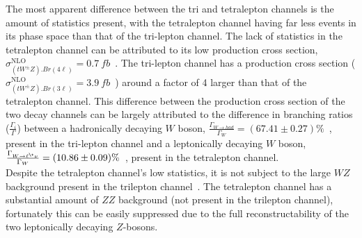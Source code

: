 The most apparent difference between the tri and tetralepton channels is the amount of statistics present, with the tetralepton channel having far less events in its phase space than that of the tri-lepton channel. The lack of statistics in the tetralepton channel can be attributed to its low production cross section, $\sigma^{\text{NLO}}_{(tW^{\pm}Z).Br(4\ell)} = \SI{0.7}{fb}$~\cite{twz-theory-paper}. The tri-lepton channel has a production cross section ($\sigma^{\text{NLO}}_{(tW^{\pm}Z).Br(3\ell)} = \SI{3.9}{fb}$~\cite{twz-theory-paper}) around a factor of 4 larger than that of the tetralepton channel. This difference between the production cross section of the two decay channels can be largely attributed to the difference in branching ratios ($\frac{\Gamma_i}{\Gamma}$) between a hadronically decaying $W$ boson, $\frac{\Gamma_{W \rightarrow had}}{\Gamma_W} = (67.41 \pm 0.27) \%$~\cite{pdg}, present in the tri-lepton channel and a leptonically decaying $W$ boson, $\frac{\Gamma_{W \rightarrow \ell^{\+} \nu}}{\Gamma_W}  = (10.86 \pm 0.09) \%$~\cite{pdg}, present in the tetralepton channel.\\

Despite the tetralepton channel's low statistics, it is not subject to the large $WZ$ background present in the trilepton channel~\cite{ben-thesis}. The tetralepton channel has a substantial amount of $ZZ$ background (not present in the trilepton channel), fortunately this can be easily suppressed due to the full reconstructability of the two leptonically decaying $Z$-bosons.









